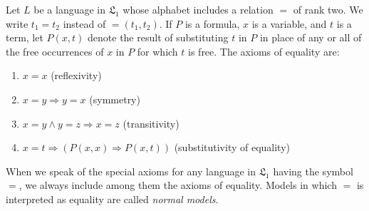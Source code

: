 Let $L$ be a language in $\mathfrak{L}_1$ whose alphabet includes a relation $=$ of rank two. We write $t_1 = t_2$ instead of $= (t_1, t_2)$. If $P$ is a formula, $x$ is a variable, and $t$ is a term, let $P(x, t)$ denote the result of substituting $t$ in $P$ in place of any or all of the free occurrences of $x$ in $P$ for which $t$ is free. The axioms of equality are:

\begin{enumerate}
\item $x = x$ (reflexivity)
\item $x = y \Rightarrow y = x$ (symmetry)
\item $x = y \wedge y = z \Rightarrow x = z$ (transitivity)
\item $x = t \Rightarrow (P(x, x) \Rightarrow P(x, t))$ (substitutivity of equality)
\end{enumerate}

When we speak of the special axioms for any language in $\mathfrak{L}_1$ having the symbol $=$, we always include among them the axioms of equality. Models in which $=$ is interpreted as equality are called \textit{normal models}.

